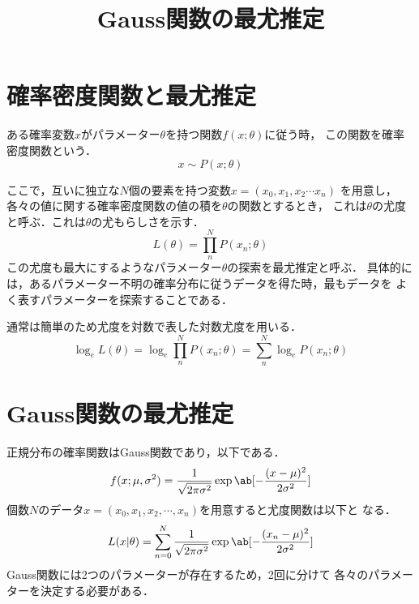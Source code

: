 \documentclass{jlreq}
\title{Gauss関数の最尤推定}
\author{}
\begin{document}
	\maketitle
	\section{確率密度関数と最尤推定}
		ある確率変数\(x\)がパラメーター\(\theta\)を持つ関数\(f(x;\theta)\)に従う時，
		この関数を確率密度関数という．
			\begin{equation}
				x \sim P(x;\theta)
			\end{equation}

		ここで，互いに独立な\(N\)個の要素を持つ変数\(x=(x_0,x_1,x_2\cdots x_n)\)
		を用意し，各々の値に関する確率密度関数の値の積を\(\theta\)の関数とするとき，
		これは\(\theta\)の尤度と呼ぶ．これは\(\theta\)の尤もらしさを示す．
			\begin{equation}
				L(\theta) = \prod_n^N P(x_n;\theta)
			\end{equation}
		この尤度も最大にするようなパラメーター\(\theta\)の探索を最尤推定と呼ぶ．
		具体的には，あるパラメーター不明の確率分布に従うデータを得た時，最もデータを
		よく表すパラメーターを探索することである．

		通常は簡単のため尤度を対数で表した対数尤度を用いる．
			\begin{equation}
				\log_eL(\theta)=\log_e\prod_n^NP(x_n;\theta)=
				\sum_{n}^N\log_eP(x_n;\theta)
			\end{equation}
		

	\section*{Gauss関数の最尤推定}
		正規分布の確率関数はGauss関数であり，以下である．
			\begin{equation}
				f(x;\mu,\sigma^2) = \frac{1}{\sqrt{2\pi\sigma^2}}
				\exp\ab[{-\frac{(x-\mu)^2}{2\sigma^2}}] \label{eq:Gauss}
			\end{equation}
		個数\(N\)のデータ\(x=(x_0,x_1,x_2,\cdots,x_n)\)を用意すると尤度関数は以下と
		なる．
			\begin{equation}
				L(x|\theta) = \sum_{n=0}^N \frac{1}{\sqrt{2\pi\sigma^2}}
				\exp\ab[{-\frac{(x_n-\mu)^2}{2\sigma^2}}] \label{eq:likelihood}
			\end{equation}
		Gauss関数には2つのパラメーターが存在するため，2回に分けて
		各々のパラメーターを決定する必要がある．
		
\end{document}
